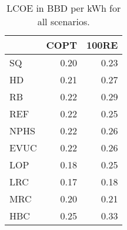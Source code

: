 \begin{table}
\centering
\caption{LCOE in BBD per kWh for all scenarios.}
\label{tab:lcoe}
\begin{tabular}{lrr}
\toprule
{} &  COPT &  100RE \\
\midrule
SQ   &  0.20 &   0.23 \\
HD   &  0.21 &   0.27 \\
RB   &  0.22 &   0.29 \\
REF  &  0.22 &   0.25 \\
NPHS &  0.22 &   0.26 \\
EVUC &  0.22 &   0.26 \\
LOP  &  0.18 &   0.25 \\
LRC  &  0.17 &   0.18 \\
MRC  &  0.20 &   0.21 \\
HBC  &  0.25 &   0.33 \\
\bottomrule
\end{tabular}
\end{table}
